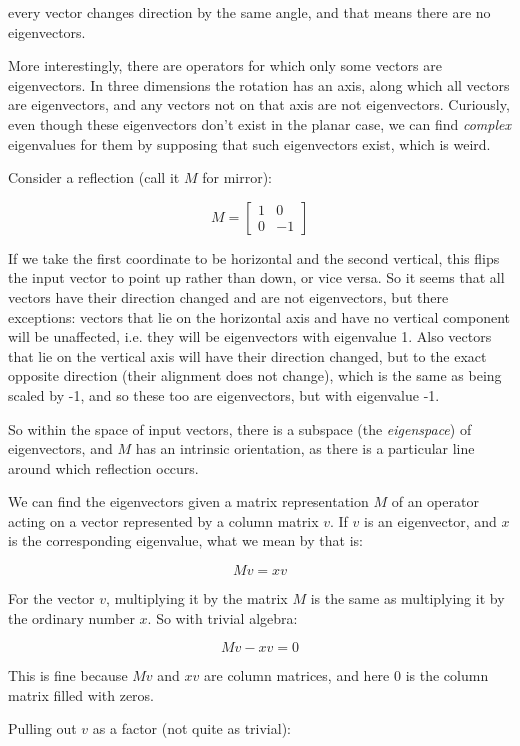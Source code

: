 every vector changes direction by the same angle, and that means there are no eigenvectors.

More interestingly, there are operators for which only some vectors are eigenvectors. In three dimensions the rotation has an axis, along which all vectors are eigenvectors, and any vectors not on that axis are not eigenvectors. Curiously, even though these eigenvectors don't exist in the planar case, we can find \textit{complex} eigenvalues for them by supposing that such eigenvectors exist, which is weird.

Consider a reflection (call it $M$ for mirror):

$$M = \begin{bmatrix}1 & 0 \\ 0 & -1\end{bmatrix}$$

If we take the first coordinate to be horizontal and the second vertical, this flips the input vector to point up rather than down, or vice versa. So it seems that all vectors have their direction changed and are not eigenvectors, but there exceptions: vectors that lie on the horizontal axis and have no vertical component will be unaffected, i.e. they will be eigenvectors with eigenvalue 1. Also vectors that lie on the vertical axis will have their direction changed, but to the exact opposite direction (their alignment does not change), which is the same as being scaled by -1, and so these too are eigenvectors, but with eigenvalue -1.

So within the space of input vectors, there is a subspace (the \textit{eigenspace}) of eigenvectors, and $M$ has an intrinsic orientation, as there is a particular line around which reflection occurs.

We can find the eigenvectors given a matrix representation $M$ of an operator acting on a vector represented by a column matrix $v$. If $v$ is an eigenvector, and $x$ is the corresponding eigenvalue, what we mean by that is:

$$Mv = xv$$

For the vector $v$, multiplying it by the matrix $M$ is the same as multiplying it by the ordinary number $x$. So with trivial algebra:

$$Mv - xv = 0$$

This is fine because $Mv$ and $xv$ are column matrices, and here $0$ is the column matrix filled with zeros.

Pulling out $v$ as a factor (not quite as trivial):

